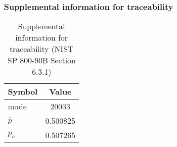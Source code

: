 \documentclass[a3paper,xelatex,english]{bxjsarticle}
\begin{document}
\subsubsection{Supplemental information for traceability}
\renewcommand{\arraystretch}{1.8}
\begin{table}[h]
\caption{Supplemental information for traceability (NIST SP 800-90B Section 6.3.1)}
\begin{center}
\begin{tabular}{|l|c|}
\hline 
\rowcolor{anotherlightblue} %
Symbol				& Value \\ \hline 
mode				&    20033\\ \hline 
$\hat{p}$ 			& 0.500825\\ \hline
$p_u$				& 0.507265\\ \hline
\end{tabular}
\end{center}
\end{table}
\renewcommand{\arraystretch}{1.4}
\clearpage
\end{document}
